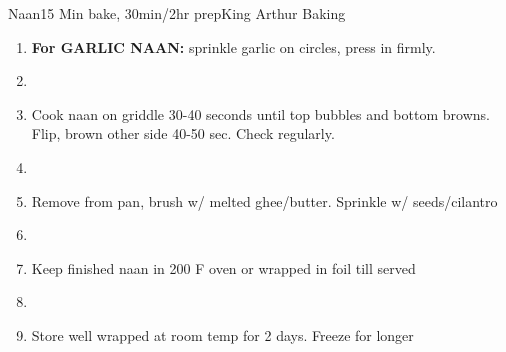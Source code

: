 \documentclass[]{mikescards}
\begin{document}
\begin{recipe}{Naan}{15 Min bake, 30min/2hr prep}{King Arthur Baking}
\begin{parcolumns}[colwidths={1=100pt}, rulebetween]{2}
{\begin{enumerate}
      \item \textbf{For GARLIC NAAN:} sprinkle garlic on circles, press in firmly.
      \item 
      \item Cook naan on griddle 30-40 seconds until top bubbles and bottom browns. Flip, brown other side 40-50 sec. Check regularly.
      \item 
      \item Remove from pan, brush w/ melted ghee/butter. Sprinkle w/ seeds/cilantro
      \item 
      \item Keep finished naan in 200 \textdegree F oven or wrapped in foil till served
      \item 
      \item Store well wrapped at room temp for 2 days. Freeze for longer
    \end{enumerate}
  }
\end{parcolumns}



\end{recipe}
\end{document}
